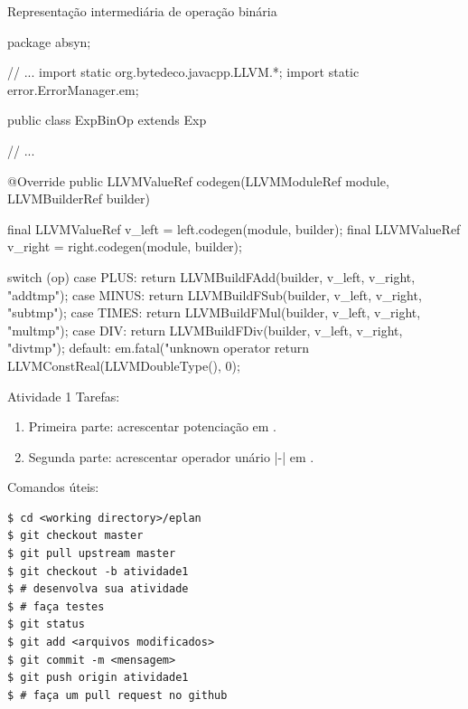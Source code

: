 \begin{frame}{Representação intermediária de operação binária}
  \tiny
\begin{pygmented}[]
package absyn;

// ...
import static org.bytedeco.javacpp.LLVM.*;
import static error.ErrorManager.em;

public class ExpBinOp extends Exp {

   // ...

   @Override
   public LLVMValueRef codegen(LLVMModuleRef module, LLVMBuilderRef builder) {
      final LLVMValueRef v_left = left.codegen(module, builder);
      final LLVMValueRef v_right = right.codegen(module, builder);

      switch (op) {
         case PLUS:
            return LLVMBuildFAdd(builder, v_left, v_right, "addtmp");
         case MINUS:
            return LLVMBuildFSub(builder, v_left, v_right, "subtmp");
         case TIMES:
            return LLVMBuildFMul(builder, v_left, v_right, "multmp");
         case DIV:
            return LLVMBuildFDiv(builder, v_left, v_right, "divtmp");
         default:
            em.fatal("unknown operator %
            return LLVMConstReal(LLVMDoubleType(), 0);
      }
   }
}
\end{pygmented}
\end{frame}



\begin{frame}{Atividade 1}
  Tarefas:
  \begin{enumerate}
    \item Primeira parte: acrescentar potenciação em \lang{}.
    \item Segunda parte: acrescentar operador unário \pyginline|-| em
    \lang{}.
  \end{enumerate}
  Comandos úteis:
\begin{Verbatim}[frame=single]
$ cd <working directory>/eplan
$ git checkout master
$ git pull upstream master
$ git checkout -b atividade1
$ # desenvolva sua atividade
$ # faça testes
$ git status
$ git add <arquivos modificados>
$ git commit -m <mensagem>
$ git push origin atividade1
$ # faça um pull request no github
\end{Verbatim}
\end{frame}






